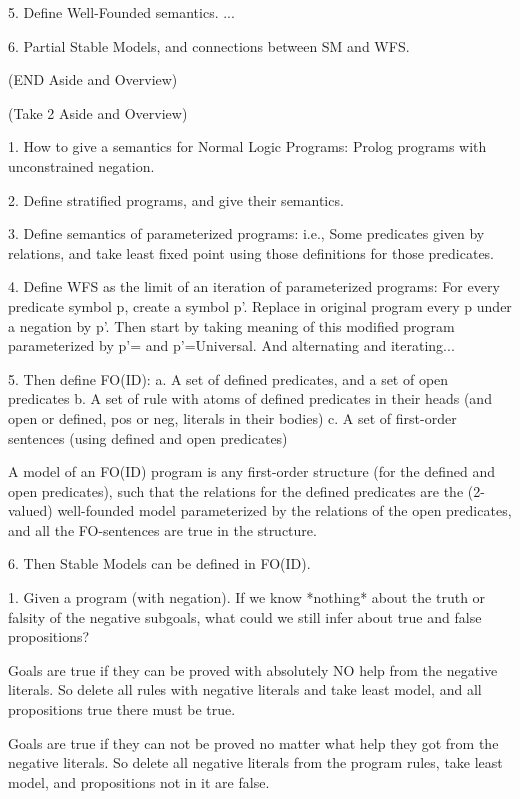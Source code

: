 5. Define Well-Founded semantics.  ...

6. Partial Stable Models, and connections between SM and WFS.

(END Aside and Overview)

(Take 2 Aside and Overview)

1. How to give a semantics for Normal Logic Programs: Prolog programs
with unconstrained negation.

2. Define stratified programs, and give their semantics.

3. Define semantics of parameterized programs: i.e., Some predicates
given by relations, and take least fixed point using those definitions
for those predicates.

4. Define WFS as the limit of an iteration of parameterized programs:
For every predicate symbol p, create a symbol p'.  Replace in original
program every p under a negation by p'. Then start by taking meaning
of this modified program parameterized by p'={} and p'=Universal. And
alternating and iterating...

5. Then define FO(ID): 
a. A set of defined predicates, and a set of open predicates
b. A set of rule with atoms of defined predicates in their heads
	(and open or defined, pos or neg, literals in their bodies)
c. A set of first-order sentences (using defined and open predicates)

A model of an FO(ID) program is any first-order structure (for the
defined and open predicates), such that the relations for the defined
predicates are the (2-valued) well-founded model parameterized by the
relations of the open predicates, and all the FO-sentences are true in
the structure.

6. Then Stable Models can be defined in FO(ID).




1. Given a program (with negation).  If we know *nothing* about the
truth or falsity of the negative subgoals, what could we still infer
about true and false propositions?  

Goals are true if they can be proved with absolutely NO help from
the negative literals.  So delete all rules with negative literals and
take least model, and all propositions true there must be true.

Goals are true if they can not be proved no matter what help they got
from the negative literals.  So delete all negative literals from the
program rules, take least model, and propositions not in it are false.

